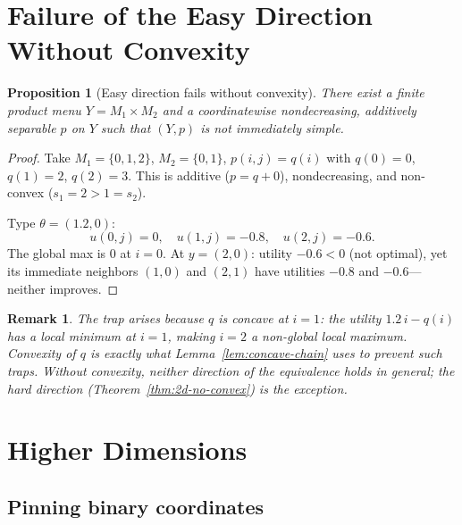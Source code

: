 \documentclass[11pt]{article}
\newtheorem{proposition}[theorem]{Proposition}
\newtheorem{remark}[theorem]{Remark}
\begin{document}
\section{Failure of the Easy Direction Without Convexity}%
\label{sec:easy-fail}

\begin{proposition}[Easy direction fails without convexity]%
\label{prop:easy-fail}
There exist a finite product menu $Y = M_1 \times M_2$ and a
coordinatewise nondecreasing, additively separable $p$ on $Y$ such
that $(Y, p)$ is not immediately simple.
\end{proposition}

\begin{proof}
Take $M_1 = \{0, 1, 2\}$, $M_2 = \{0, 1\}$,
$p(i, j) = q(i)$ with $q(0) = 0$, $q(1) = 2$, $q(2) = 3$.
This is additive ($p = q + 0$), nondecreasing, and non-convex
($s_1 = 2 > 1 = s_2$).

Type $\theta = (1.2, 0)$:
\[
  u(0,j) = 0, \quad u(1,j) = -0.8, \quad u(2,j) = -0.6.
\]
The global max is $0$ at $i = 0$.  At $y = (2,0)$: utility $-0.6 < 0$
(not optimal), yet its immediate neighbors $(1,0)$ and $(2,1)$ have
utilities $-0.8$ and $-0.6$---neither improves.
\end{proof}

\begin{remark}\label{rem:easy-fail-mechanism}
The trap arises because $q$ is concave at $i = 1$: the utility
$1.2\,i - q(i)$ has a local minimum at $i = 1$, making $i = 2$ a
non-global local maximum.  Convexity of $q$ is exactly what
Lemma~\ref{lem:concave-chain} uses to prevent such traps.  Without
convexity, neither direction of the equivalence holds in general;
the hard direction (Theorem~\ref{thm:2d-no-convex}) is the exception.
\end{remark}

\section{Higher Dimensions}\label{sec:higher}

\subsection{Pinning binary coordinates}
\end{document}
